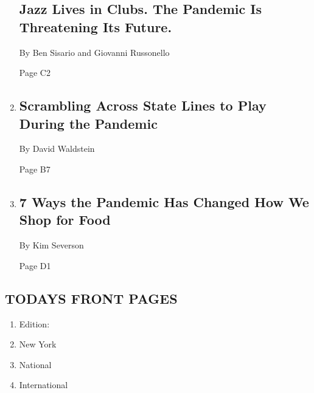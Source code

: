 \begin{enumerate}
  \hypertarget{jazz-lives-in-clubs-the-pandemic-is-threatening-its-future}{%
  \subsection{Jazz Lives in Clubs. The Pandemic Is Threatening Its
  Future.}\label{jazz-lives-in-clubs-the-pandemic-is-threatening-its-future}}

  By Ben Sisario and Giovanni Russonello

  Page C2
\item
  \href{/2020/09/03/sports/ncaafootball/high-school-football-coronavirus-pandemic.html}{}

  \hypertarget{scrambling-across-state-lines-to-play-during-the-pandemic}{%
  \subsection{Scrambling Across State Lines to Play During the
  Pandemic}\label{scrambling-across-state-lines-to-play-during-the-pandemic}}

  By David Waldstein

  Page B7
\item
  \href{/2020/09/08/dining/grocery-shopping-coronavirus.html}{}

  \hypertarget{7-ways-the-pandemic-has-changed-how-we-shop-for-food}{%
  \subsection{7 Ways the Pandemic Has Changed How We Shop for
  Food}\label{7-ways-the-pandemic-has-changed-how-we-shop-for-food}}

  By Kim Severson

  Page D1
\end{enumerate}

\hypertarget{todays-front-pages}{%
\subsection{TODAYS FRONT PAGES}\label{todays-front-pages}}

\begin{enumerate}
\def\labelenumi{\arabic{enumi}.}
\tightlist
\item
  Edition:
\item
  New York
\item
  National
\item
  International
\end{enumerate}

